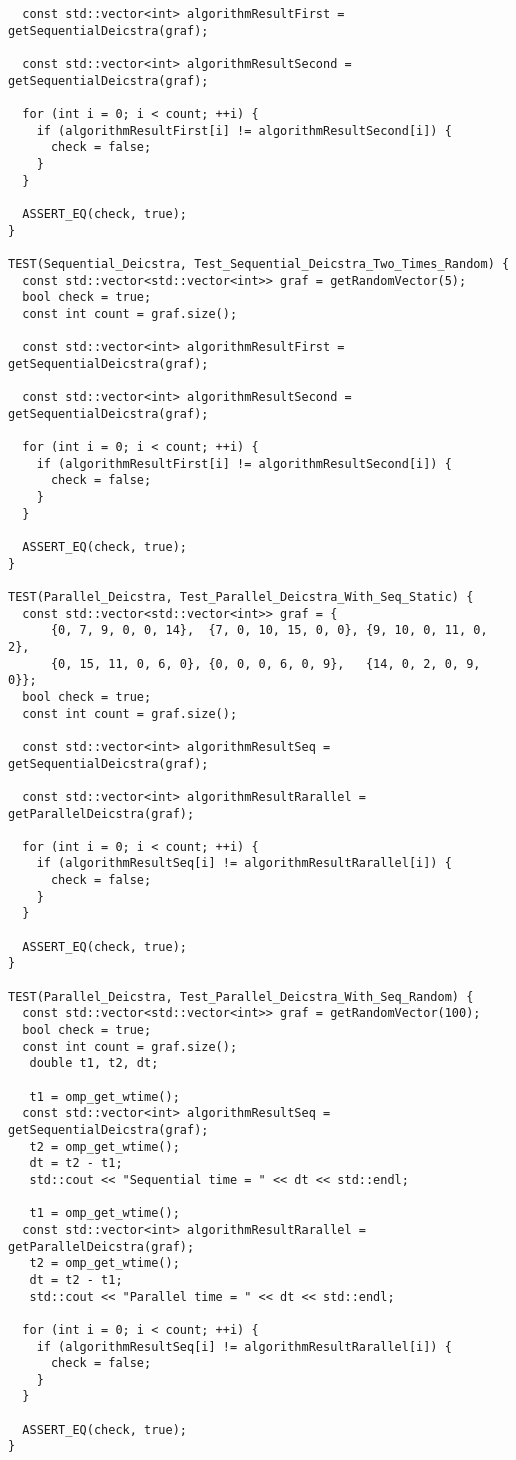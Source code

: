 \documentclass{report}
\begin{document}
\begin{lstlisting}
  const std::vector<int> algorithmResultFirst = getSequentialDeicstra(graf);

  const std::vector<int> algorithmResultSecond = getSequentialDeicstra(graf);

  for (int i = 0; i < count; ++i) {
    if (algorithmResultFirst[i] != algorithmResultSecond[i]) {
      check = false;
    }
  }

  ASSERT_EQ(check, true);
}

TEST(Sequential_Deicstra, Test_Sequential_Deicstra_Two_Times_Random) {
  const std::vector<std::vector<int>> graf = getRandomVector(5);
  bool check = true;
  const int count = graf.size();

  const std::vector<int> algorithmResultFirst = getSequentialDeicstra(graf);

  const std::vector<int> algorithmResultSecond = getSequentialDeicstra(graf);

  for (int i = 0; i < count; ++i) {
    if (algorithmResultFirst[i] != algorithmResultSecond[i]) {
      check = false;
    }
  }

  ASSERT_EQ(check, true);
}

TEST(Parallel_Deicstra, Test_Parallel_Deicstra_With_Seq_Static) {
  const std::vector<std::vector<int>> graf = {
      {0, 7, 9, 0, 0, 14},  {7, 0, 10, 15, 0, 0}, {9, 10, 0, 11, 0, 2},
      {0, 15, 11, 0, 6, 0}, {0, 0, 0, 6, 0, 9},   {14, 0, 2, 0, 9, 0}};
  bool check = true;
  const int count = graf.size();

  const std::vector<int> algorithmResultSeq = getSequentialDeicstra(graf);

  const std::vector<int> algorithmResultRarallel = getParallelDeicstra(graf);

  for (int i = 0; i < count; ++i) {
    if (algorithmResultSeq[i] != algorithmResultRarallel[i]) {
      check = false;
    }
  }

  ASSERT_EQ(check, true);
}

TEST(Parallel_Deicstra, Test_Parallel_Deicstra_With_Seq_Random) {
  const std::vector<std::vector<int>> graf = getRandomVector(100);
  bool check = true;
  const int count = graf.size();
   double t1, t2, dt;

   t1 = omp_get_wtime();
  const std::vector<int> algorithmResultSeq = getSequentialDeicstra(graf);
   t2 = omp_get_wtime();
   dt = t2 - t1;
   std::cout << "Sequential time = " << dt << std::endl;

   t1 = omp_get_wtime();
  const std::vector<int> algorithmResultRarallel = getParallelDeicstra(graf);
   t2 = omp_get_wtime();
   dt = t2 - t1;
   std::cout << "Parallel time = " << dt << std::endl;

  for (int i = 0; i < count; ++i) {
    if (algorithmResultSeq[i] != algorithmResultRarallel[i]) {
      check = false;
    }
  }

  ASSERT_EQ(check, true);
}

\end{lstlisting}
\end{document}
